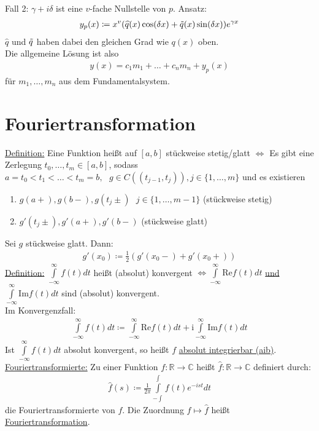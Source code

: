 \documentclass{article}
\newcommand{\ci}{\text{i}}
\newcommand{\cRe}{\text{Re}}
\newcommand{\cIm}{\text{Im}}
\begin{document}
Fall 2: $\gamma + i \delta$ ist eine $v$-fache Nullstelle von $p$. Ansatz:
\begin{align*}
    y_p(x) \coloneqq x^v(\widehat{q}(x)\cos(\delta x) + \Tilde{q}(x) \sin(\delta x))e^{\gamma x}
\end{align*}
$\widehat{q}$ und $\Tilde{q}$ haben dabei den gleichen Grad wie $q(x)$ oben. \\
Die allgemeine Lösung ist also
\begin{align*}
    y(x) = c_1m_1 + \ldots + c_nm_n + y_p(x)
\end{align*}
für $m_1, \ldots, m_n$ aus dem Fundamentalsystem.

\section{Fouriertransformation}
\underline{Definition:} Eine Funktion heißt auf $[a,b]$ stückweise stetig/glatt $\Leftrightarrow$ Es gibt eine Zerlegung $t_0, \ldots, t_m \in [a,b]$,
sodass $a=t_0 < t_1 < \ldots < t_m=b, \text{ } g \in C((t_{j-1},t_j)), j \in \{ 1, \ldots,m\}$ und es existieren
\begin{enumerate}
    \item $g(a+),g(b-),g(t_j\pm) \text{ } j \in \{ 1, \ldots, m-1\}$ (stückweise stetig)
    \item $g'(t_j \pm), g'(a+),g'(b-)$ (stückweise glatt)
\end{enumerate}
Sei $g$ stückweise glatt. Dann:
\begin{align*}
    g'(x_0) \coloneqq \frac{1}{2} (g'(x_0-) + g'(x_0+))
\end{align*}
\underline{Definition:} $\int \limits_{-\infty}^{\infty} f(t)dt$ heißt (absolut) konvergent $\Leftrightarrow \int \limits_{-\infty}^{\infty} \text{Re}f(t)dt$ 
\underline{und} $\int \limits_{-\infty}^{\infty} \text{Im}f(t)dt$ sind (absolut) konvergent. \\
Im Konvergenzfall: 
\begin{align*}
    \int \limits_{-\infty}^\infty f(t) dt \coloneqq  \int \limits_{-\infty}^\infty \cRe f(t) dt +  \ci \int \limits_{-\infty}^\infty \cIm f(t) dt
\end{align*} 
Ist $ \int \limits_{-\infty}^\infty f(t) dt$ absolut konvergent, so heißt $f$ \underline{absolut integrierbar (aib)}. \\
\underline{Fouriertransformierte:}
Zu einer Funktion $f: \mathbb{R} \to \mathbb{C}$ heißt $\widehat{f}:\mathbb{R} \to \mathbb{C}$ definiert durch:
\begin{align*}
    \widehat{f}(s) \coloneqq \frac{1}{2\pi} \int \limits_{-\int}^\int f(t) e^{-ist} dt
\end{align*}
die Fouriertransformierte von $f$. Die Zuordnung $f \mapsto \widehat{f}$ heißt \underline{Fouriertransformation}.
\end{document}
